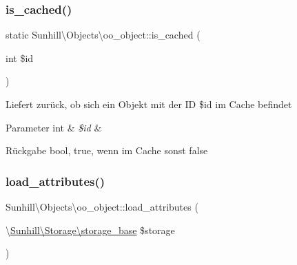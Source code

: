 \mbox{\label{classSunhill_1_1Objects_1_1oo__object_a160cdc249d3923a81878b5562a9a5a2b}} 
\subsubsection{\texorpdfstring{is\+\_\+cached()}{is\_cached()}}
{\footnotesize\ttfamily static Sunhill\textbackslash{}\+Objects\textbackslash{}oo\+\_\+object\+::is\+\_\+cached (\begin{DoxyParamCaption}\item[{int}]{\$id }\end{DoxyParamCaption})\hspace{0.3cm}{\ttfamily [static]}}

Liefert zurück, ob sich ein Objekt mit der ID \$id im Cache befindet 
\begin{DoxyParams}[1]{Parameter}
int & {\em \$id} & \\
\hline
\end{DoxyParams}
\begin{DoxyReturn}{Rückgabe}
bool, true, wenn im Cache sonst false 
\end{DoxyReturn}
\mbox{\label{classSunhill_1_1Objects_1_1oo__object_a78048073960c982da8b1d12b26952f1c}} 
\subsubsection{\texorpdfstring{load\+\_\+attributes()}{load\_attributes()}}
{\footnotesize\ttfamily Sunhill\textbackslash{}\+Objects\textbackslash{}oo\+\_\+object\+::load\+\_\+attributes (\begin{DoxyParamCaption}\item[{\textbackslash{}\hyperlink{classSunhill_1_1Storage_1_1storage__base}{Sunhill\textbackslash{}\+Storage\textbackslash{}storage\+\_\+base}}]{\$storage }\end{DoxyParamCaption})\hspace{0.3cm}{\ttfamily [protected]}}


